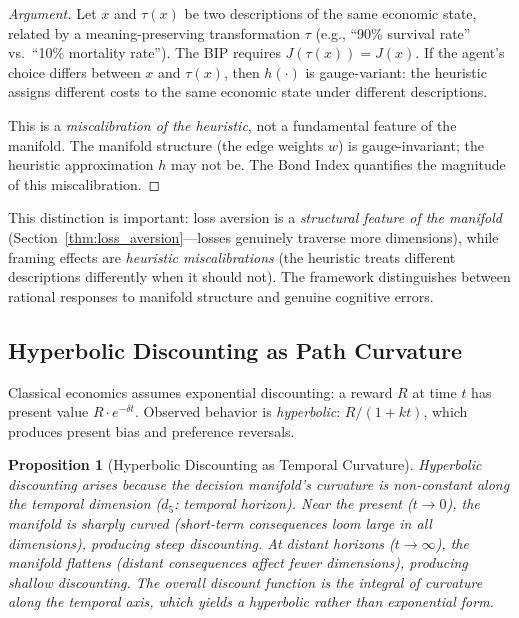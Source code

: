 \documentclass[12pt]{article}
\newtheorem{proposition}[theorem]{Proposition}
\theoremstyle{definition}
\theoremstyle{remark}
\begin{document}
\begin{proof}[Argument]
Let $x$ and $\tau(x)$ be two descriptions of the same economic state, related by a meaning-preserving transformation $\tau$ (e.g., ``90\% survival rate'' vs.\ ``10\% mortality rate'').  The BIP requires $J(\tau(x)) = J(x)$.  If the agent's choice differs between $x$ and $\tau(x)$, then $h(\cdot)$ is gauge-variant: the heuristic assigns different costs to the same economic state under different descriptions.

This is a \emph{miscalibration of the heuristic}, not a fundamental feature of the manifold.  The manifold structure (the edge weights $w$) is gauge-invariant; the heuristic approximation $h$ may not be.  The Bond Index \cite{bond2026geometric} quantifies the magnitude of this miscalibration.
\end{proof}

This distinction is important: loss aversion is a \emph{structural feature of the manifold} (Section~\ref{thm:loss_aversion}---losses genuinely traverse more dimensions), while framing effects are \emph{heuristic miscalibrations} (the heuristic treats different descriptions differently when it should not).  The framework distinguishes between rational responses to manifold structure and genuine cognitive errors.

\subsection{Hyperbolic Discounting as Path Curvature}

Classical economics assumes exponential discounting: a reward $R$ at time $t$ has present value $R \cdot e^{-\delta t}$.  Observed behavior is \emph{hyperbolic}: $R / (1 + kt)$, which produces present bias and preference reversals.

\begin{proposition}[Hyperbolic Discounting as Temporal Curvature]
\label{prop:hyperbolic}
Hyperbolic discounting arises because the decision manifold's curvature is non-constant along the temporal dimension ($d_5$: temporal horizon).  Near the present ($t \to 0$), the manifold is sharply curved (short-term consequences loom large in all dimensions), producing steep discounting.  At distant horizons ($t \to \infty$), the manifold flattens (distant consequences affect fewer dimensions), producing shallow discounting.  The overall discount function is the integral of curvature along the temporal axis, which yields a hyperbolic rather than exponential form.
\end{proposition}
\end{document}
